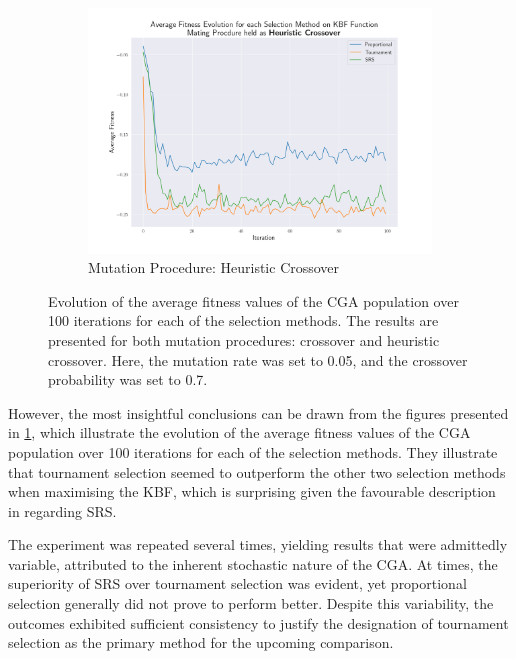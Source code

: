\documentclass[10pt]{article}
\begin{document}
\begin{multicols}{2}
\begin{figure}[H]
\begin{subfigure}{0.44\textwidth}
        \includegraphics[width=\textwidth]{../figures/Ungenerated Images/Fitness_Evolution_Heuristic Crossover.png}
        \caption{Mutation Procedure: Heuristic Crossover}
    \end{subfigure}
    \captionsetup{justification=centering}
    \caption{Evolution of the average fitness values of the CGA population over 100 iterations for each of the selection methods. The results are presented for both mutation procedures: crossover and heuristic crossover. Here, the mutation rate was set to 0.05, and the crossover probability was set to 0.7.}
    \label{fig:CGA_fitness_evo}
\end{figure}

However, the most insightful conclusions can be drawn from the figures presented in \ref{fig:CGA_fitness_evo}, which illustrate the evolution of the average fitness values of the CGA population over 100 iterations for each of the selection methods. They illustrate that tournament selection seemed to outperform the other two selection methods when maximising the KBF, which is surprising given the favourable description in \cite{parks2023geneticalgorithms} regarding SRS. 

The experiment was repeated several times, yielding results that were admittedly variable, attributed to the inherent stochastic nature of the CGA. At times, the superiority of SRS over tournament selection was evident, yet proportional selection generally did not prove to perform better. Despite this variability, the outcomes exhibited sufficient consistency to justify the designation of tournament selection as the primary method for the upcoming comparison.


\end{multicols}
\end{document}
